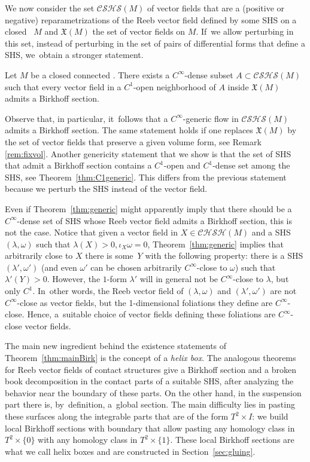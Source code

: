 We now consider the set $\mathcal{CSHS}(M)$ of vector fields that are a (positive or negative) reparametrizations of the Reeb vector field defined by some SHS on a closed \threemanifold~$M$ and $\mathfrak{X}(M)$ the set of vector fields on $M$. If~we allow perturbing in this set, instead of perturbing in the set of pairs of differential forms that define a SHS, we~obtain a stronger statement.

\begin{thm}\label{thm:generic}
Let $M$ be a closed connected \threemanifold. There exists a $C^\infty$-dense subset $A\subset \mathcal{CSHS}(M)$ such that every vector field in a $C^1$-open neighborhood of $A$ inside $\mathfrak{X}(M)$ admits a Birkhoff section.
\end{thm}

Observe that, in particular, it~follows that a $C^\infty$-generic flow in $\mathcal{CSHS}(M)$ admits a Birkhoff section. The same statement holds if one replaces $\mathfrak{X}(M)$ by the set of vector fields that preserve a given volume form, see Remark \ref{rem:fixvol}. Another genericity statement that we show is that the set of SHS that admit a Birkhoff section contains a $C^1$-open and $C^1$-dense set among the SHS, see Theorem~\ref{thm:C1generic}. This differs from the previous statement because we perturb the SHS instead of the vector field.

\begin{Remark}
Even if Theorem~\ref{thm:generic} might apparently imply that there should be a $C^\infty$-dense set of SHS whose Reeb vector field admits a Birkhoff section, this is not the case. Notice that given a vector field in $X\in \mathcal{CHSH}(M)$ and a SHS $(\lambda,\omega)$ such that $\lambda(X)>0, \iota_X\omega=0$, Theorem~\ref{thm:generic} implies that arbitrarily close to $X$ there is some~$Y$ with the following property: there is a SHS$(\lambda',\omega')$ (and even $\omega'$ can be chosen arbitrarily $C^\infty$-close to $\omega$) such that $\lambda'(Y)>0$. However, the $1$-form $\lambda'$ will in general not be $C^\infty$-close to $\lambda$, but only $C^1$. In~other words, the Reeb vector field of $(\lambda,\omega)$ and $(\lambda',\omega')$ are not $C^\infty$-close as vector fields, but the 1-dimensional foliations they define are $C^\infty$-close. Hence, a~suitable choice of vector fields defining these foliations are $C^\infty$-close vector fields.
\end{Remark}

The main new ingredient behind the existence statements of Theorem~\ref{thm:mainBirk} is the concept of a \emph{helix box}. The analogous theorems for Reeb vector fields of contact structures give a Birkhoff section and a broken book decomposition in the contact parts of a suitable SHS, after analyzing the behavior near the boundary of these parts. On the other hand, in the suspension part there is, by~definition, a~global section. The main difficulty lies in pasting these surfaces along the integrable parts that are of the form $T^2\times I$: we build local Birkhoff sections with boundary that allow pasting any homology class in $T^2\times\{0\}$ with any homology class in $T^2\times\{1\}$. These local Birkhoff sections are what we call helix boxes and are constructed in Section~\ref{sec:gluing}.

